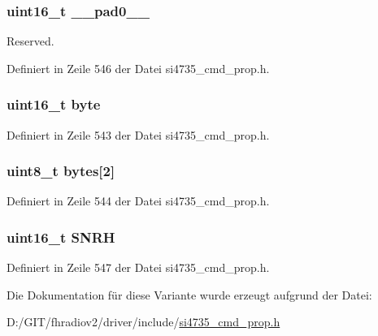 \subsubsection[{\+\_\+\+\_\+pad0\+\_\+\+\_\+}]{\setlength{\rightskip}{0pt plus 5cm}uint16\+\_\+t \+\_\+\+\_\+pad0\+\_\+\+\_\+}\label{unionfm__rsq__snr__hi__thres_a77132c2c26a75f5b8751b235cda23828}


Reserved. 



Definiert in Zeile 546 der Datei si4735\+\_\+cmd\+\_\+prop.\+h.

\hypertarget{unionfm__rsq__snr__hi__thres_ab0549c1b5ea980a02e7eab77e21fea49}{}
\subsubsection[{byte}]{\setlength{\rightskip}{0pt plus 5cm}uint16\+\_\+t byte}\label{unionfm__rsq__snr__hi__thres_ab0549c1b5ea980a02e7eab77e21fea49}


Definiert in Zeile 543 der Datei si4735\+\_\+cmd\+\_\+prop.\+h.

\hypertarget{unionfm__rsq__snr__hi__thres_a46e4c05d20a047ec169f60d3167e912e}{}
\subsubsection[{bytes}]{\setlength{\rightskip}{0pt plus 5cm}uint8\+\_\+t bytes\mbox{[}2\mbox{]}}\label{unionfm__rsq__snr__hi__thres_a46e4c05d20a047ec169f60d3167e912e}


Definiert in Zeile 544 der Datei si4735\+\_\+cmd\+\_\+prop.\+h.

\hypertarget{unionfm__rsq__snr__hi__thres_ad10645239ad4d7fb5b5f61a834285bb9}{}
\subsubsection[{S\+N\+R\+H}]{\setlength{\rightskip}{0pt plus 5cm}uint16\+\_\+t S\+N\+R\+H}\label{unionfm__rsq__snr__hi__thres_ad10645239ad4d7fb5b5f61a834285bb9}


Definiert in Zeile 547 der Datei si4735\+\_\+cmd\+\_\+prop.\+h.



Die Dokumentation für diese Variante wurde erzeugt aufgrund der Datei\+:\begin{DoxyCompactItemize}
\item 
D\+:/\+G\+I\+T/fhradiov2/driver/include/\hyperlink{si4735__cmd__prop_8h}{si4735\+\_\+cmd\+\_\+prop.\+h}\end{DoxyCompactItemize}
